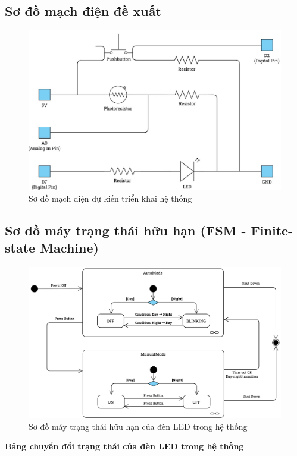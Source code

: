 \subsection{Sơ đồ mạch điện đề xuất}
\begin{figure}[H]
    \centering
    \includegraphics[scale=0.35]{img/Circuit.jpg}
    \caption{Sơ đồ mạch điện dự kiến triển khai hệ thống}
    \label{fig:my_label}
\end{figure}

\subsection{Sơ đồ máy trạng thái hữu hạn (FSM - Finite-state Machine)}
\begin{figure}[H]
    \centering
    \includegraphics[scale=0.16]{img/FSM-2.jpg}
    \caption{Sơ đồ máy trạng thái hữu hạn của đèn LED trong hệ thống}
    \label{fig:my_label}
\end{figure}

\textbf{Bảng chuyển đổi trạng thái của đèn LED trong hệ thống}

